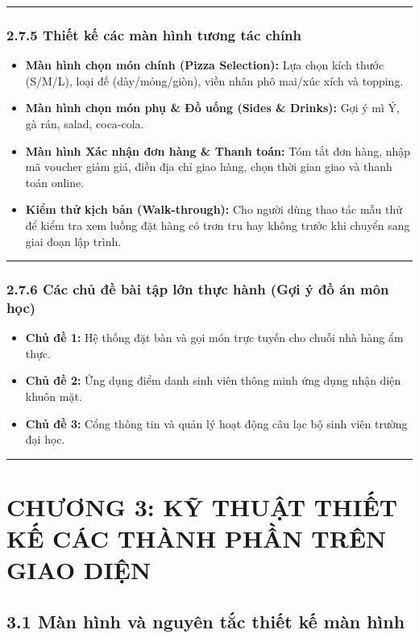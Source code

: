 \documentclass[11pt,a4paper,oneside]{report}
\begin{document}
\bigskip\hrule\bigskip

\subsection{2.7.5 Thiết kế các màn hình tương tác chính}
\begin{itemize}[leftmargin=1.5em]
\item \textbf{Màn hình chọn món chính (Pizza Selection):} Lựa chọn kích thước (S/M/L), loại đế (dày/mỏng/giòn), viền nhân phô mai/xúc xích và topping.
\item \textbf{Màn hình chọn món phụ \& Đồ uống (Sides \& Drinks):} Gợi ý mì Ý, gà rán, salad, coca-cola.
\item \textbf{Màn hình Xác nhận đơn hàng \& Thanh toán:} Tóm tắt đơn hàng, nhập mã voucher giảm giá, điền địa chỉ giao hàng, chọn thời gian giao và thanh toán online.
\item \textbf{Kiểm thử kịch bản (Walk-through):} Cho người dùng thao tác mẫu thử để kiểm tra xem luồng đặt hàng có trơn tru hay không trước khi chuyển sang giai đoạn lập trình.
\end{itemize}

\bigskip\hrule\bigskip

\subsection{2.7.6 Các chủ đề bài tập lớn thực hành (Gợi ý đồ án môn học)}
\begin{itemize}[leftmargin=1.5em]
\item \textbf{Chủ đề 1:} Hệ thống đặt bàn và gọi món trực tuyến cho chuỗi nhà hàng ẩm thực.
\item \textbf{Chủ đề 2:} Ứng dụng điểm danh sinh viên thông minh ứng dụng nhận diện khuôn mặt.
\item \textbf{Chủ đề 3:} Cổng thông tin và quản lý hoạt động câu lạc bộ sinh viên trường đại học.
\end{itemize}


\bigskip\hrule\bigskip

\chapter{CHƯƠNG 3: KỸ THUẬT THIẾT KẾ CÁC THÀNH PHẦN TRÊN GIAO DIỆN}

\section{3.1 Màn hình và nguyên tắc thiết kế màn hình}
\end{document}
